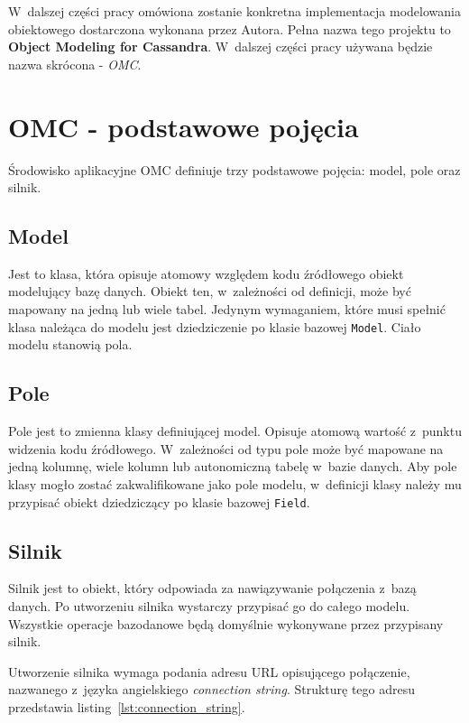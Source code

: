 W~dalszej części pracy omówiona zostanie konkretna implementacja modelowania obiektowego dostarczona wykonana przez Autora. Pełna nazwa tego projektu to \textbf{Object Modeling for Cassandra}. W~dalszej części pracy używana będzie nazwa skrócona - \emph{OMC}.

\section{OMC - podstawowe pojęcia}

Środowisko aplikacyjne OMC definiuje trzy podstawowe pojęcia: model, pole oraz silnik.

\subsection{Model}

Jest to klasa, która opisuje atomowy względem kodu źródłowego obiekt modelujący bazę danych. Obiekt ten, w~zależności od definicji, może być mapowany na jedną lub wiele tabel. Jedynym wymaganiem, które musi spełnić klasa należąca do modelu jest dziedziczenie po klasie bazowej \verb+Model+. Ciało modelu stanowią pola.

\subsection{Pole}

Pole jest to zmienna klasy definiującej model. Opisuje atomową wartość z~punktu widzenia kodu źródłowego. W~zależności od typu pole może być mapowane na jedną kolumnę, wiele kolumn lub autonomiczną tabelę w~bazie danych. Aby pole klasy mogło zostać zakwalifikowane jako pole modelu, w~definicji klasy należy mu przypisać obiekt dziedziczący po klasie bazowej \verb+Field+.

\subsection{Silnik}

Silnik jest to obiekt, który odpowiada za nawiązywanie połączenia z~bazą danych. Po utworzeniu silnika wystarczy przypisać go do całego modelu. Wszystkie operacje bazodanowe będą domyślnie wykonywane przez przypisany silnik. 

Utworzenie silnika wymaga podania adresu URL opisującego połączenie, nazwanego z~języka angielskiego \emph{connection string}. Strukturę tego adresu przedstawia listing~\ref{lst:connection_string}.

